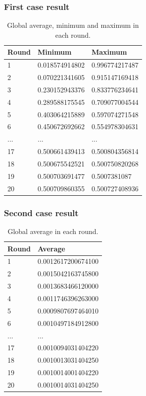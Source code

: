 \documentclass{beamer}
\begin{document}
\begin{frame}
\frametitle{First case result}
\begin{table}
\begin{tabular}{l l l}
\toprule
\textbf{Round} & \textbf{Minimum} & \textbf{Maximum}\\
\midrule
1 & 0.018574914802 & 0.996774217487 \\
2 & 0.070221341605 & 0.915147169418 \\
3 & 0.230152943376 & 0.833776234641 \\
4 & 0.289588175545 & 0.709077004544 \\
5 & 0.403064215889 & 0.597074271548 \\
6 & 0.450672692662 & 0.554978304631 \\
... & ... & ... \\
17  & 0.500661439413 & 0.500804356814 \\
18  & 0.500675542521 & 0.500750820268 \\
19  & 0.500703691477 & 0.5007381087 \\
20  & 0.500709860355 & 0.500727408936 \\
\bottomrule
\end{tabular}
\caption{Global average, minimum and maximum in each round.}
\end{table}
\end{frame}

\begin{frame}
\frametitle{Second case result}
\begin{table}
\begin{tabular}{l l}
\toprule
\textbf{Round} & \textbf{Average}\\
\midrule
1 & 0.0012617200674100 \\
2 & 0.0015042163745800 \\
3 & 0.0013683466120000 \\
4 & 0.0011746396263000 \\
5 & 0.0009807697464010 \\
6 & 0.0010497184912800 \\
... & ... \\
17  & 0.0010094031404220 \\
18  & 0.0010013031404250 \\
19  & 0.0010014001404220 \\
20  & 0.0010014031404250 \\
\bottomrule
\end{tabular}
\caption{Global average in each round.}
\end{table}
\end{frame}
\end{document}
